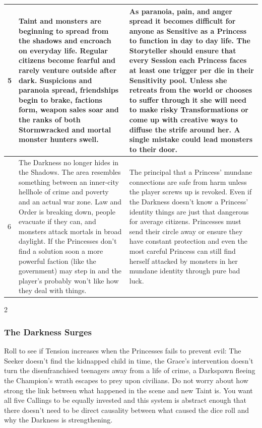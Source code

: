 \begin{longtable}{|l|p{7cm}|p{7cm}|}
		5 & Taint and monsters are beginning to spread from the shadows and encroach on everyday life. Regular citizens become fearful and rarely venture outside after dark. Suspicions and paranoia spread, friendships begin to brake, factions form, weapon sales soar and the ranks of both Stormwracked and mortal monster hunters swell. & As paranoia, pain, and anger spread it becomes difficult for anyone as Sensitive as a Princess to function in day to day life. The Storyteller should ensure that every Session each Princess faces at least one trigger per die in their Sensitivity pool. Unless she retreats from the world or chooses to suffer through it she will need to make risky Transformations or come up with creative ways to diffuse the strife around her. A single mistake could lead monsters to their door. \\ \hline
		6 & The Darkness no longer hides in the Shadows. The area resembles something between an inner-city hellhole of crime and poverty and an actual war zone. Law and Order is breaking down, people evacuate if they can, and monsters attack mortals in broad daylight. If the Princesses don't find a solution soon a more powerful faction (like the government) may step in and the player's probably won't like how they deal with things. & The principal that a Princess' mundane connections are safe from harm unless the player screws up is revoked. Even if the Darkness doesn't know a Princess' identity things are just that dangerous for average citizens. Princesses must send their circle away or ensure they have constant protection and even the most careful Princess can still find herself attacked by monsters in her mundane identity through pure bad luck.\\ 
        \hline
\end{longtable}\begin{multicols}{2}\raggedcolumns
\subsubsection*{The Darkness Surges}

Roll to see if Tension increases when the Princesses fails to prevent evil: The Seeker doesn’t find the kidnapped child in time, the Grace’s intervention doesn’t turn the disenfranchised teenagers away from a life of crime, a Darkspawn fleeing the Champion’s wrath escapes to prey upon civilians. Do not worry about how strong the link between what happened in the scene and new Taint is. You want all five Callings to be equally invested and this system is abstract enough that there doesn’t need to be direct causality between what caused the dice roll and why the Darkness is strengthening. 


\end{multicols}
